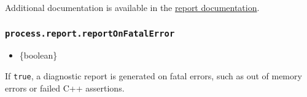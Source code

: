 \begin{Shaded}
\begin{Highlighting}[]
\OperatorTok{=} \NormalTok{(}\NormalTok{)}\OperatorTok{;}
\OperatorTok{=} \NormalTok{(}\NormalTok{)}\OperatorTok{;}

\OperatorTok{=}\NormalTok{()}\OperatorTok{;}
\NormalTok{)}\OperatorTok{;}

\OperatorTok{=} \NormalTok{(}\NormalTok{)}\OperatorTok{;}
\NormalTok{(}\OperatorTok{,}\OperatorTok{,} \NormalTok{)}\OperatorTok{;}
\end{Highlighting}
\end{Shaded}

Additional documentation is available in the \href{report.md}{report
documentation}.

\subsubsection{\texorpdfstring{\texttt{process.report.reportOnFatalError}}{process.report.reportOnFatalError}}\label{process.report.reportonfatalerror}

\begin{itemize}
\tightlist
\item
  \{boolean\}
\end{itemize}

If \texttt{true}, a diagnostic report is generated on fatal errors, such
as out of memory errors or failed C++ assertions.

\begin{Shaded}
\begin{Highlighting}[]
 \OperatorTok{;}

\NormalTok{(}\SpecialCharTok{$\{}\SpecialCharTok{\}}\VerbatimStringTok{\textasciigrave{}}\NormalTok{)}\OperatorTok{;}
\end{Highlighting}
\end{Shaded}

